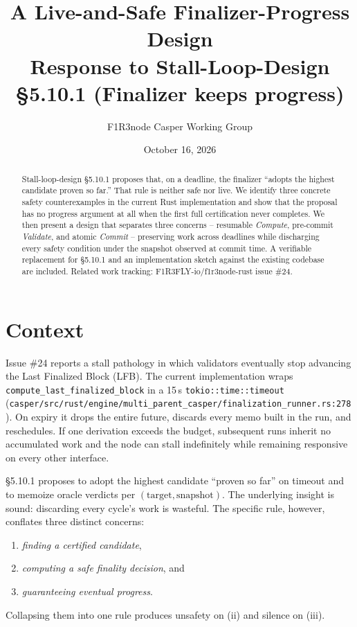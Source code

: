 \documentclass[11pt]{article}
\title{A Live-and-Safe Finalizer-Progress Design\\
       \large Response to Stall-Loop-Design §5.10.1 (Finalizer keeps progress)}
\author{F1R3node Casper Working Group}
\date{October 16, 2026}
\newcommand{\code}[1]{\texttt{#1}}
\begin{document}
\maketitle

\begin{abstract}
Stall-loop-design §5.10.1 proposes that, on a deadline, the finalizer
``adopts the highest candidate proven so far.'' That rule is neither safe
nor live. We identify three concrete safety counterexamples in the current
Rust implementation and show that the proposal has no progress argument at
all when the first full certification never completes. We then present a
design that separates three concerns -- resumable \emph{Compute},
pre-commit \emph{Validate}, and atomic \emph{Commit} -- preserving work
across deadlines while discharging every safety condition under the
snapshot observed at commit time. A verifiable replacement for §5.10.1
and an implementation sketch against the existing codebase are included.
Related work tracking: F1R3FLY-io/f1r3node-rust issue \#24.
\end{abstract}

\tableofcontents

\section{Context}

Issue \#24 reports a stall pathology in which validators eventually stop
advancing the Last Finalized Block (LFB). The current implementation wraps
\code{compute\_last\_finalized\_block} in a 15\,s
\code{tokio::time::timeout}
(\code{casper/src/rust/engine/multi\_parent\_casper/finalization\_runner.rs:278}).
On expiry it drops the entire future, discards every memo built in the run,
and reschedules. If one derivation exceeds the budget, subsequent runs
inherit no accumulated work and the node can stall indefinitely while
remaining responsive on every other interface.

§5.10.1 proposes to adopt the highest candidate ``proven so far'' on
timeout and to memoize oracle verdicts per $(\text{target},
\text{snapshot})$. The underlying insight is sound: discarding every
cycle's work is wasteful. The specific rule, however, conflates three
distinct concerns:
\begin{enumerate}[label=(\roman*)]
\item \emph{finding a certified candidate},
\item \emph{computing a safe finality decision}, and
\item \emph{guaranteeing eventual progress}.
\end{enumerate}
Collapsing them into one rule produces unsafety on (ii) and silence on
(iii).
\end{document}
